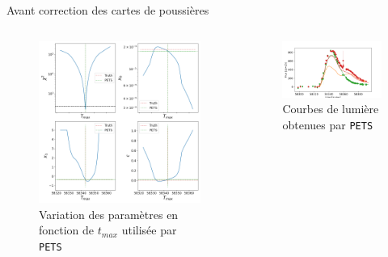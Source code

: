 \documentclass{beamer}
\def\pets{\texttt{PETS}\xspace}
\begin{document}
\begin{frame}{Avant correction des cartes de poussières}
\begin{columns}
\begin{column}{.5\textwidth}
\begin{figure}
	\centering
	\includegraphics[width=.9\textwidth]{figures/26_pets_old.png}
	\caption{Variation des paramètres en fonction de $t_{max}$ utilisée par \pets}
\end{figure}
\end{column}

\begin{column}{.5\textwidth}
\begin{figure}
	\centering
	\includegraphics[width=.9\textwidth]{figures/26_lc_pets.png}
	\caption{Courbes de lumière obtenues par \pets}
\end{figure}
\end{column}
\end{columns}
\end{frame}
\end{document}
